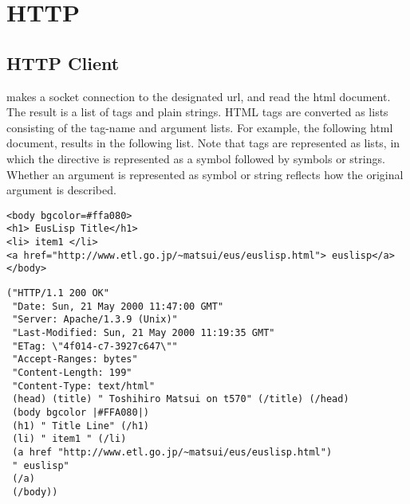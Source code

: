 
\section{HTTP}

\subsection{HTTP Client}

\begin{refdesc}




{makes a socket connection to the designated url, and
read the html document.
The result is a list of tags and plain strings.
HTML tags are converted as lists consisting of the tag-name
and argument lists.
For example, the following html document,
results in the following list.
Note that tags are represented as lists, in which
the directive is represented as a symbol
followed by symbols or strings.
Whether an argument is represented as symbol or string
reflects how the original argument is described.}


\begin{verbatim}
<body bgcolor=#ffa080>
<h1> EusLisp Title</h1>
<li> item1 </li>
<a href="http://www.etl.go.jp/~matsui/eus/euslisp.html"> euslisp</a>
</body>
\end{verbatim}

\begin{verbatim}
("HTTP/1.1 200 OK"
 "Date: Sun, 21 May 2000 11:47:00 GMT"
 "Server: Apache/1.3.9 (Unix)"
 "Last-Modified: Sun, 21 May 2000 11:19:35 GMT"
 "ETag: \"4f014-c7-3927c647\""
 "Accept-Ranges: bytes"
 "Content-Length: 199"
 "Content-Type: text/html"
 (head) (title) " Toshihiro Matsui on t570" (/title) (/head)
 (body bgcolor |#FFA080|)
 (h1) " Title Line" (/h1)
 (li) " item1 " (/li)
 (a href "http://www.etl.go.jp/~matsui/eus/euslisp.html")
 " euslisp"
 (/a)
 (/body))
\end{verbatim}



\end{refdesc}

